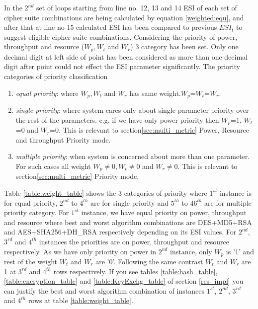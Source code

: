 \documentclass[3p,times]{elsarticle}
\begin{document}
In the $2^{nd}$ set of loops starting from line no. 12, 13 and 14 ESI of each set of cipher suite combinations are being calculated by equation \ref{weighted:equ}, and after that at line no 15 calculated ESI has been compared to previous $ESI_t$ to suggest eligible cipher suite combinations.
Considering the priority of power, throughput and resource ($W_p, W_t$ and $W_r$) 3 category has been set. Only one decimal digit at left side of point has been considered as more than one decimal digit after point could not effect the ESI parameter significantly. The priority categories of priority classification
\begin{enumerate} 
\item \textit{equal priority}: where $W_p, W_t$ and $W_r$ has same weight.$W_p$=$W_t$=$W_r$.
\item \textit{single priority}: where system cares only about single parameter priority over the rest of the parameters. e.g. if we have only power priority then $W_p$=1, $W_t$=0 and $W_r$=0. This is relevant to section\ref{sec:multi_metric} Power, Resource and throughput Priority mode.
\item \textit{multiple priority}: when system is concerned about more than one parameter. For such cases all weight $W_p\neq0, W_t\neq0$ and $W_r\neq0$.  This is relevant to section\ref{sec:multi_metric} Priority mode.
\end{enumerate}
Table \ref{table:weight_table} shows the 3 categories of priority where $1 ^{st}$ instance is for equal priority, $2^{nd}$ to $4^{th}$ are for single priority and $5^{th}$ to $46^{th}$ are for multiple priority category. For  $1^{st}$ instance, we have equal priority on power, throughput and resource where best and worst algorithm combinations are  DES+MD5+RSA and AES+SHA256+DH\_RSA respectively depending on its ESI values. For $2^{nd}$, $3^{rd}$ and $4^{th}$ instances the priorities are on power, throughput and resource respectively. As we have only priority on power in $2^{nd}$ instance, only $W_p$ is '1' and rest of the weight $W_t$ and $W_r$ are '0'. Following the same contrast $W_t$ and $W_r$ are 1 at  $3^{rd}$ and $4^{th}$ rows respectively. If you see tables \ref{table:hash_table}, \ref{table:encryption_table} and \ref{table:KeyExchg_table} of section \ref{res_impl} you can justify the best and worst algorithm combination of instances
$1^{st}$, $2^{nd}$, $3^{rd}$ and $4^{th}$ rows at table \ref{table:weight_table}. 
\end{document}
